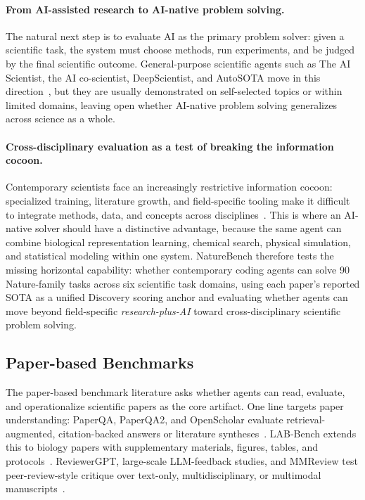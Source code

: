 \paragraph{From AI-assisted research to AI-native problem solving.}
The natural next step is to evaluate AI as the primary problem solver: given a scientific task, the system must choose methods, run experiments, and be judged by the final scientific outcome. General-purpose scientific agents such as The AI Scientist, the AI co-scientist, DeepScientist, and AutoSOTA move in this direction~\citep{lu2026towards,gottweis2026accelerating,weng2025deepscientist,li2026autosota}, but they are usually demonstrated on self-selected topics or within limited domains, leaving open whether AI-native problem solving generalizes across science as a whole.

\paragraph{Cross-disciplinary evaluation as a test of breaking the information cocoon.}
Contemporary scientists face an increasingly restrictive information cocoon: specialized training, literature growth, and field-specific tooling make it difficult to integrate methods, data, and concepts across disciplines~\citep{hao2026artificial,zhou2025advancing,piao2023human}. This is where an AI-native solver should have a distinctive advantage, because the same agent can combine biological representation learning, chemical search, physical simulation, and statistical modeling within one system. NatureBench therefore tests the missing horizontal capability: whether contemporary coding agents can solve 90 Nature-family tasks across six scientific task domains, using each paper's reported SOTA as a unified Discovery scoring anchor and evaluating whether agents can move beyond field-specific \emph{research-plus-AI} toward cross-disciplinary scientific problem solving.







 
 
\subsection{Paper-based Benchmarks}
\label{sec:rel:paper}
The paper-based benchmark literature asks whether agents can read, evaluate, and operationalize scientific papers as the core artifact. One line targets paper understanding: PaperQA, PaperQA2, and OpenScholar evaluate retrieval-augmented, citation-backed answers or literature syntheses~\citep{lala2023paperqa,skarlinski2024paperqa2,asai2024openscholar}. LAB-Bench extends this to biology papers with supplementary materials, figures, tables, and protocols~\citep{laurent2024labbench}. ReviewerGPT, large-scale LLM-feedback studies, and MMReview test peer-review-style critique over text-only, multidisciplinary, or multimodal manuscripts~\citep{liu2023reviewergpt,liang2023llmfeedback,gao2025mmreview}.

